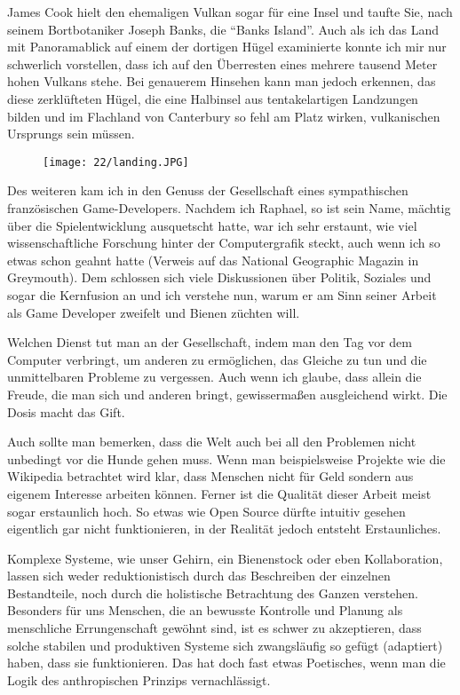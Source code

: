 James Cook hielt den ehemaligen Vulkan sogar für eine Insel und taufte
Sie, nach seinem Bortbotaniker Joseph Banks, die ``Banks Island''. Auch
als ich das Land mit Panoramablick auf einem der dortigen Hügel
examinierte konnte ich mir nur schwerlich vorstellen, dass ich auf den
Überresten eines mehrere tausend Meter hohen Vulkans stehe. Bei
genauerem Hinsehen kann man jedoch erkennen, das diese zerklüfteten
Hügel, die eine Halbinsel aus tentakelartigen Landzungen bilden und im
Flachland von Canterbury so fehl am Platz wirken, vulkanischen
Ursprungs sein müssen.

\begin{figure}[h]
  \centering
  \texttt{[image: 22/landing.JPG]}
\end{figure}
Des weiteren kam ich in den Genuss der Gesellschaft eines sympathischen
französischen Game-Developers. Nachdem ich Raphael, so ist sein Name,
mächtig über die Spielentwicklung ausquetscht hatte, war ich sehr
erstaunt, wie viel wissenschaftliche Forschung hinter der Computergrafik
steckt, auch wenn ich so etwas schon geahnt hatte (Verweis auf das
National Geographic Magazin in Greymouth). Dem schlossen sich viele
Diskussionen über Politik, Soziales und sogar die Kernfusion an und ich
verstehe nun, warum er am Sinn seiner Arbeit als Game Developer zweifelt
und Bienen züchten will.

Welchen Dienst tut man an der Gesellschaft, indem man den Tag vor dem
Computer verbringt, um anderen zu ermöglichen, das Gleiche zu tun und
die unmittelbaren Probleme zu vergessen. Auch wenn ich glaube, dass
allein die Freude, die man sich und anderen bringt, gewissermaßen
ausgleichend wirkt. Die Dosis macht das Gift.

Auch sollte man bemerken, dass die Welt auch bei all den Problemen
nicht unbedingt vor die Hunde gehen muss. Wenn man beispielsweise
Projekte wie die Wikipedia betrachtet wird klar, dass Menschen nicht
für Geld sondern aus eigenem Interesse arbeiten können. Ferner ist die
Qualität dieser Arbeit meist sogar erstaunlich hoch. So etwas wie Open
Source dürfte intuitiv gesehen eigentlich gar nicht funktionieren, in
der Realität jedoch entsteht Erstaunliches.

Komplexe Systeme, wie unser Gehirn, ein Bienenstock oder eben
Kollaboration, lassen sich weder reduktionistisch durch das
Beschreiben der einzelnen Bestandteile, noch durch die holistische
Betrachtung des Ganzen verstehen. Besonders für uns Menschen, die an
bewusste Kontrolle und Planung als menschliche Errungenschaft gewöhnt
sind, ist es schwer zu akzeptieren, dass solche stabilen und
produktiven Systeme sich zwangsläufig so gefügt (adaptiert) haben,
dass sie funktionieren. Das hat doch fast etwas Poetisches, wenn man
die Logik des anthropischen Prinzips vernachlässigt.

